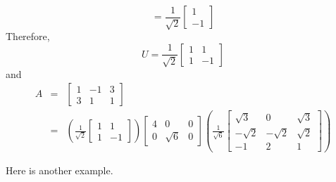 \documentclass{ximera}
\begin{document}
\begin{example}
\begin{explanation}
\[=\frac{1}{\sqrt 2}\left[\begin{array}{r} 1\\ -1 \end{array}\right]
\]
Therefore,
\[ U=\frac{1}{\sqrt{2}}\left[\begin{array}{rr} 1 & 1 \\
1 & -1 \end{array}\right]\]
and
\begin{eqnarray*}
A & = & \left[\begin{array}{rrr} 1 & -1 & 3 \\ 3 & 1 & 1 \end{array}\right]\\
& = & \left(\frac{1}{\sqrt{2}}\left[\begin{array}{rr} 1 & 1 \\
1 & -1 \end{array}\right]\right)
\left[\begin{array}{rrr} 4 & 0 & 0 \\
0 & \sqrt 6 & 0 \end{array}\right]
\left(\frac{1}{\sqrt{6}}\left[\begin{array}{rrr}
\sqrt 3 & 0 & \sqrt 3  \\
-\sqrt 2 & -\sqrt 2 & \sqrt2 \\
-1 & 2 & 1 \end{array}\right]\right)
\end{eqnarray*}
\end{explanation}
\end{example}


Here is another example.
\end{document}

